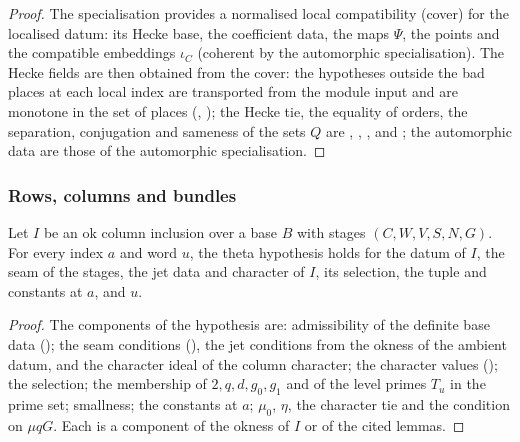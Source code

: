 \begin{proof}
The specialisation provides a normalised local compatibility (cover) for the localised datum: its Hecke base, the
coefficient data, the maps $\Psi$, the points and the compatible embeddings $\iota_C$ (coherent by the automorphic specialisation).
The Hecke fields are then obtained from the cover: the hypotheses outside the bad places at each local index are transported from the
module input and are monotone in the set of places (,
); the Hecke tie, the equality of orders, the separation, conjugation and sameness
of the sets $Q$ are , , ,
 and ; the automorphic data are those of the
automorphic specialisation.
\end{proof}

\subsubsection{Rows, columns and bundles}\label{sec:pf:stageU:rowsmisc}

\begin{lemma}\label{pf:stageU:hypcolin}
Let $I$ be an ok column inclusion over a base $B$ with stages $(C,W,V,S,N,G)$. For every index $a$ and word $u$, the theta hypothesis
holds for the datum of $I$, the seam of the stages, the jet data and character of $I$, its selection, the tuple and constants at
$a$, and $u$.
\end{lemma}

\begin{proof}
The components of the hypothesis are: admissibility of the definite base data
(); the seam conditions (), the jet
conditions from the okness of the ambient datum, and the character ideal of the column character; the character values
(); the selection; the membership of $2,q,d,g_0,g_1$ and of the level primes $T_u$ in the
prime set; smallness; the constants at $a$; $\mu_0$, $\eta$, the character tie and the condition on $\mu q G$. Each is a component of
the okness of $I$ or of the cited lemmas.
\end{proof}

